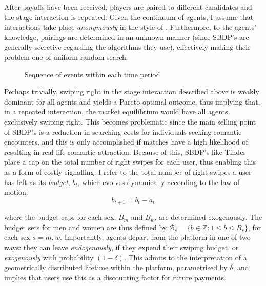 After payoffs have been received, players are paired to different candidates and the stage interaction is repeated. Given the continuum of agents, I assume that interactions take place \textit{anonymously} in the style of \cite{jovanovic1988anonymous}. Furthermore, to the agents' knowledge, pairings are determined in an unknown manner (since SBDP's are generally secretive regarding the algorithms they use), effectively making their problem one of uniform random search.

\begin{figure}[ht]
    \centering 
    \caption{Sequence of events within each time period}
    \vspace{20pt} 
    \label{fig:timeline}
\end{figure}

Perhaps trivially, swiping right in the stage interaction described above is weakly dominant for all agents and yields a Pareto-optimal outcome, thus implying that, in a repeated interaction, the market equilibrium would have all agents exclusively swiping right. This becomes problematic since the main selling point of SBDP's is a reduction in searching costs for individuals seeking romantic encounters, and this is only accomplished if matches have a high likelihood of resulting in real-life romantic attraction. Because of this, SBDP's like Tinder place a cap on the total number of right swipes for each user, thus enabling this as a form of costly signalling. I refer to the total number of right-swipes a user has left as its \textit{budget}, $b_t$, which evolves dynamically according to the law of motion: 
\begin{equation*} 
  b_{t+1}= b_{t}- a_{t} 
\end{equation*}

where the budget caps for each sex, $B_m$ and $B_w$, are determined exogenously. The budget sets for men and women are thus defined by $\mathcal{B}_{s}=\{b \in \mathbb{Z} : 1\leq b \leq B_s\}$, for each sex $s=m,w$. Importantly, agents depart from the platform in one of two ways: they can leave \textit{endogenously}, if they expend their swiping budget, or \textit{exogenously} with probability $(1-\delta)$. This admits to the interpretation of a geometrically distributed lifetime within the platform, parametrised by $\delta$, and implies that users use this as a discounting factor for future payments.

